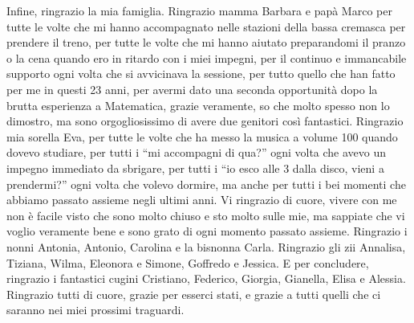 \noindent Infine, ringrazio la mia famiglia. Ringrazio mamma Barbara e papà Marco per tutte le volte che mi hanno accompagnato nelle stazioni della bassa cremasca per prendere il treno, per tutte le volte che mi hanno aiutato preparandomi il pranzo o la cena quando ero in ritardo con i miei impegni, per il continuo e immancabile supporto ogni volta che si avvicinava la sessione, per tutto quello che han fatto per me in questi 23 anni, per avermi dato una seconda opportunità dopo la brutta esperienza a Matematica, grazie veramente, so che molto spesso non lo dimostro, ma sono orgogliosissimo di avere due genitori così fantastici. Ringrazio mia sorella Eva, per tutte le volte che ha messo la musica a volume 100 quando dovevo studiare, per tutti i ``mi accompagni di qua?'' ogni volta che avevo un impegno immediato da sbrigare, per tutti i ``io esco alle 3 dalla disco, vieni a prendermi?'' ogni volta che volevo dormire, ma anche per tutti i bei momenti che abbiamo passato assieme negli ultimi anni. Vi ringrazio di cuore, vivere con me non è facile visto che sono molto chiuso e sto molto sulle mie, ma sappiate che vi voglio veramente bene e sono grato di ogni momento passato assieme. Ringrazio i nonni Antonia, Antonio, Carolina e la bisnonna Carla. Ringrazio gli zii Annalisa, Tiziana, Wilma, Eleonora e Simone, Goffredo e Jessica. E per concludere, ringrazio i fantastici cugini Cristiano, Federico, Giorgia, Gianella, Elisa e Alessia. \\

\noindent Ringrazio tutti di cuore, grazie per esserci stati, e grazie a tutti quelli che ci saranno nei miei prossimi traguardi.
